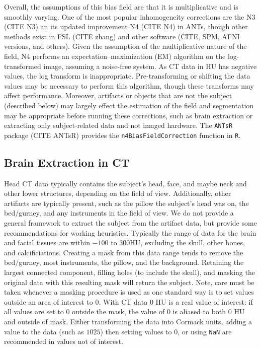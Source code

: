 \documentclass[]{elsarticle} %
\begin{document}
Overall, the assumptions of this bias field are that it is
multiplicative and is smoothly varying. One of the most popular
inhomogeneity corrections are the N3 (CITE N3) an its updated
improvement N4 (CITE N4) in ANTs, though other methods exist in FSL
(CITE zhang) and other software (CITE, SPM, AFNI versions, and others).
Given the assumption of the multiplicative nature of the field, N4
performs an expectation--maximization (EM) algorithm on the
log-transformed image, assuming a noise-free system. As CT data in HU
has negative values, the log transform is inappropriate.
Pre-transforming or shifting the data values may be necessary to perform
this algorithm, though these transforms may affect performance.
Moreover, artifacts or objects that are not the subject (described
below) may largely effect the estimation of the field and segmentation
may be appropriate before running these corrections, such as brain
extraction or extracting only subject-related data and not imaged
hardware. The \texttt{ANTsR} package (CITE ANTsR) provides the
\texttt{n4BiasFieldCorrection} function in \texttt{R}.

\hypertarget{brain-extraction-in-ct}{%
\subsection{Brain Extraction in CT}\label{brain-extraction-in-ct}}

Head CT data typically contains the subject's head, face, and maybe neck
and other lower structures, depending on the field of view.
Additionally, other artifacts are typically present, such as the pillow
the subject's head was on, the bed/gurney, and any instruments in the
field of view. We do not provide a general framework to extract the
subject from the artifact data, but provide some recommendations for
working heuristics. Typically the range of data for the brain and facial
tissues are within \(-100\) to \(300\)HU, excluding the skull, other
bones, and calcificiations. Creating a mask from this data range tends
to remove the bed/gurney, most instruments, the pillow, and the
background. Retaining the largest connected component, filling holes (to
include the skull), and masking the original data with this resulting
mask will return the subject. Note, care must be taken whenever a
masking procedure is used as one standard way is to set values outside
an area of interest to \(0\). With CT data \(0\) HU is a real value of
interest: if all values are set to \(0\) outside the mask, the value of
\(0\) is aliased to both \(0\) HU and outside of mask. Either
transforming the data into Cormack units, adding a value to the data
(such as \(1025\)) then setting values to \(0\), or using \texttt{NaN}
are recommended in values not of interest.
\end{document}
